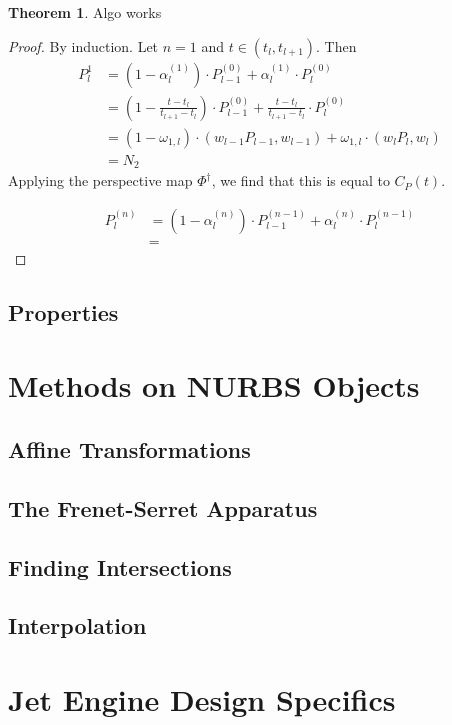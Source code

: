 \documentclass[a4paper, 11pt]{report}
\theoremstyle{definition}
\newtheorem{theorem}[definition]{Theorem}
\begin{document}
\begin{theorem}
	Algo works
\end{theorem}
\begin{proof}
	By induction. Let $n = 1$ and $t \in (t_l, t_{l+1})$. Then
	\begin{align*}
		P_l^{1} &= (1-\alpha_l^{(1)}) \cdot P_{l-1}^{(0)} + \alpha_l^{(1)} \cdot P_l^{(0)} \\
				&= \left(1-\frac{t-t_l}{t_{l+1}-t_l}\right) \cdot P_{l-1}^{(0)} + \frac{t-t_l}{t_{l+1}-t_l} \cdot P_l^{(0)} \\
				&= (1-\omega_{1,l}) \cdot (w_{l-1} P_{l-1}, w_{l-1}) + \omega_{1,l} \cdot (w_l P_l, w_l) \\
				&= N_2
	\end{align*}
	Applying the perspective map $\Phi^\dagger$, we find that this is equal to $C_P(t)$.

	\begin{align*}
		P^{(n)}_l 	&= (1-\alpha_l^{(n)}) \cdot P_{l-1}^{(n-1)} + \alpha_l^{(n)} \cdot P_l^{(n-1)} \\
					&= 
	\end{align*}

\end{proof}


\subsection{Properties}


\section{Methods on NURBS Objects}
\subsection{Affine Transformations}
\subsection{The Frenet-Serret Apparatus}
\subsection{Finding Intersections}
\subsection{Interpolation}

\section{Jet Engine Design Specifics}
\end{document}
